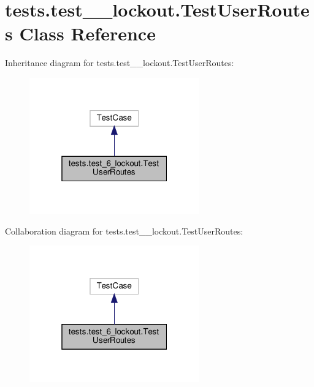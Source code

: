 \hypertarget{classtests_1_1test__6__lockout_1_1_test_user_routes}{}\section{tests.\+test\+\_\+\_\+lockout.\+Test\+User\+Routes Class Reference}
\label{classtests_1_1test__6__lockout_1_1_test_user_routes}


Inheritance diagram for tests.\+test\+\_\+\_\+lockout.\+Test\+User\+Routes\+:
\nopagebreak
\begin{figure}[H]
\begin{center}
\leavevmode
\includegraphics[width=208pt]{classtests_1_1test__6__lockout_1_1_test_user_routes__inherit__graph}
\end{center}
\end{figure}


Collaboration diagram for tests.\+test\+\_\+\_\+lockout.\+Test\+User\+Routes\+:
\nopagebreak
\begin{figure}[H]
\begin{center}
\leavevmode
\includegraphics[width=208pt]{classtests_1_1test__6__lockout_1_1_test_user_routes__coll__graph}
\end{center}
\end{figure}
